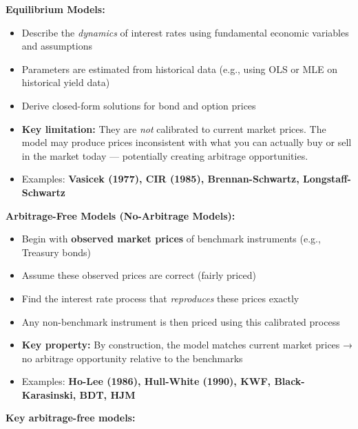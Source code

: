 \documentclass[12pt,openany]{book}
\theoremstyle{definition}
\theoremstyle{remark}
\begin{document}
\textbf{Equilibrium Models:}

\begin{itemize}
\item Describe the \emph{dynamics} of interest rates using fundamental economic variables and assumptions


\item Parameters are estimated from historical data (e.g., using OLS or MLE on historical yield data)


\item Derive closed-form solutions for bond and option prices


\item \textbf{Key limitation:} They are \emph{not} calibrated to current market prices. The model may produce prices inconsistent with what you can actually buy or sell in the market today --- potentially creating arbitrage opportunities.


\item Examples: \textbf{Vasicek (1977), CIR (1985), Brennan-Schwartz, Longstaff-Schwartz}


\end{itemize}
\textbf{Arbitrage-Free Models (No-Arbitrage Models):}

\begin{itemize}
\item Begin with \textbf{observed market prices} of benchmark instruments (e.g., Treasury bonds)


\item Assume these observed prices are correct (fairly priced)


\item Find the interest rate process that \emph{reproduces} these prices exactly


\item Any non-benchmark instrument is then priced using this calibrated process


\item \textbf{Key property:} By construction, the model matches current market prices → no arbitrage opportunity relative to the benchmarks


\item Examples: \textbf{Ho-Lee (1986), Hull-White (1990), KWF, Black-Karasinski, BDT, HJM}


\end{itemize}
\textbf{Key arbitrage-free models:}
\end{document}
